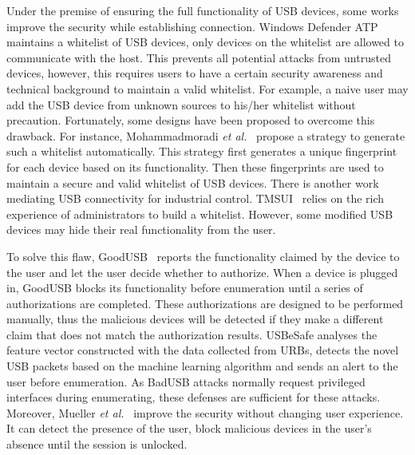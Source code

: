Under the premise of ensuring the full functionality of \ac{USB} devices, some works
improve the security while establishing connection. Windows Defender
ATP~\cite{windenfenderwhite} maintains a whitelist of \ac{USB} devices, only devices
on the whitelist are allowed to communicate with the host. This prevents all
potential attacks from untrusted devices, however, this requires users to have a
certain security awareness and technical background to maintain a valid
whitelist. For example, a naive user may add the \ac{USB} device from unknown
sources to his/her whitelist without precaution. Fortunately, some designs have been proposed to overcome
this drawback. For instance, Mohammadmoradi \emph{et al.}~\cite{mohammadmoradi2018making} propose a strategy to generate such a
whitelist automatically. This strategy first generates a unique fingerprint for
each device based on its functionality. Then these fingerprints are used to
maintain a secure and valid whitelist of \ac{USB} devices. There is another work
mediating \ac{USB} connectivity for industrial control. TMSUI~\cite{yang2015tmsui}
relies on the rich experience of administrators to build a whitelist. However, some
modified \ac{USB} devices may hide their real functionality from the user.

To solve this flaw, GoodUSB~\cite{tian2015defending} reports the functionality claimed
by the device to the user and let the user decide whether to authorize. When a device
is plugged in, GoodUSB blocks its functionality before enumeration until a
series of authorizations are completed. These authorizations are designed to be
performed manually, thus the malicious devices will be detected if they make a different claim 
that does not match the authorization results. 
USBeSafe\cite{usbesafe} analyses the 
feature vector constructed with the data collected from \acp{URB}, 
detects the novel \ac{USB} packets based on the machine learning algorithm and sends 
an alert to the user before enumeration. As BadUSB attacks normally request privileged 
interfaces during enumerating, these defenses are sufficient for these attacks.
Moreover, Mueller \emph{et al.}~\cite{MuellerZN19} improve the security without changing user experience. It can detect the presence of the user, block malicious devices in the user's absence until the session is unlocked.


